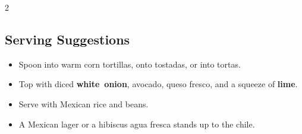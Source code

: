 \documentclass[11pt,letterpaper]{article}
\begin{document}
{\begin{multicols}{2}
\subsection*{Serving Suggestions}
\begin{itemize}
    \item Spoon into warm corn tortillas, onto tostadas, or into tortas.
    \item Top with diced \textbf{white~onion}, avocado, queso fresco, and a squeeze of \textbf{lime}.
    \item Serve with Mexican rice and beans.
    \item A Mexican lager or a hibiscus agua fresca stands up to the chile.
\end{itemize}

\end{multicols}
}
\end{document}
